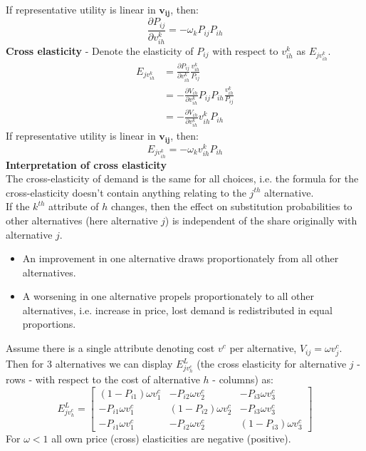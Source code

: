 \documentclass[DIV=14,titlepage=false]{scrreprt}
\begin{document}
If representative utility is linear in $\mathbf{v_{ij}}$, then:
\[
    \frac{\partial P_{ij}}{\partial v_{ih}^k} = - \omega_k P_{ij} P_{ih}
\]
\textbf{Cross elasticity} - Denote the elasticity of $P_{ij}$ with respect to $v_{ih}^k$ as $E_{jv_{ih}^k}$.
\begin{align*}
    E_{jv_{ih}^k} &= \frac{\partial P_{ij}}{\partial v_{ih}^k} \frac{v_{ih}^k}{P_{ij}} \\
    &= - \frac{\partial V_{ih}}{\partial v_{ih}^k} P_{ij} P_{ih} \frac{v_{ih}^k}{P_{ij}} \\
    &= - \frac{\partial V_{ih}}{\partial v_{ih}^k} v_{ih}^k P_{ih}
\end{align*}
If representative utility is linear in $\mathbf{v_{ij}}$, then:
\[
    E_{jv_{ih}^k} = - \omega_k v_{ih}^k P_{ih}
\]
\textbf{Interpretation of cross elasticity}\\
The cross-elasticity of demand is the same for all choices, i.e. the formula for the cross-elasticity doesn't contain anything relating to the $j^{th}$ alternative.\\
If the $k^{th}$ attribute of $h$ changes, then the effect on substitution probabilities to other alternatives (here alternative $j$) is independent of the share originally with alternative $j$.\\
\begin{itemize}
    \item An improvement in one alternative draws proportionately from all other alternatives.
    \item A worsening in one alternative propels proportionately to all other alternatives, i.e. increase in price, lost demand is redistributed in equal proportions.
\end{itemize}
\begin{example}
    Assume there is a single attribute denoting cost $v^c$ per alternative, $V_{ij} = \omega v^c_{j}$. Then for 3 alternatives we can display $E_{jv^c_{h}}^L$ (the cross elasticity for alternative $j$ - rows - with respect to the cost of alternative $h$ - columns) as:
    \[ E_{jv^c_{h}}^L =
    \begin{bmatrix}
        (1-P_{i1})\omega v^c_1 & -P_{i2}\omega v^c_2 & -P_{i3}\omega v^c_3 \\
        -P_{i1}\omega v^c_1 & (1-P_{i2})\omega v^c_2 & -P_{i3}\omega v^c_3 \\
        -P_{i1}\omega v^c_1 & -P_{i2}\omega v^c_2 & (1-P_{i3})\omega v^c_3
    \end{bmatrix}
    \]
    For $\omega<1$ all own price (cross) elasticities are negative (positive).
\end{example}
\end{document}
